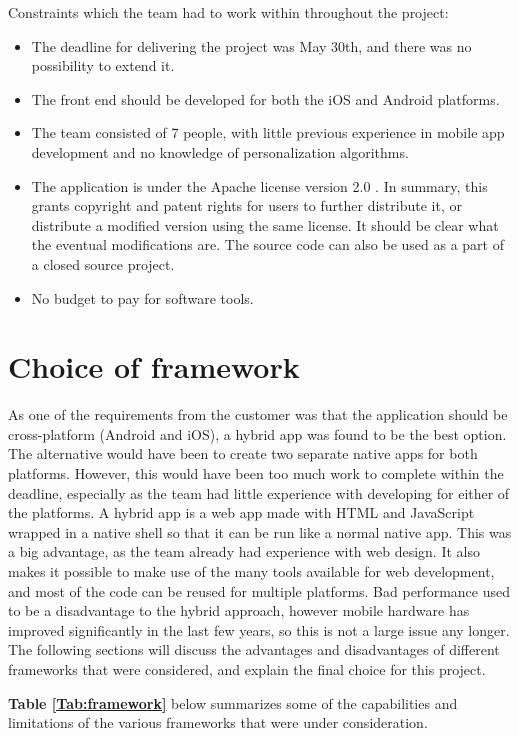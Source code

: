 Constraints which the team had to work within throughout the project:
\begin{itemize}
\item The deadline for delivering the project was May 30th, and there was no possibility to extend it.
\item The front end should be developed for both the iOS and Android platforms.
\item The team consisted of 7 people, with little previous experience in mobile app development and no knowledge of personalization algorithms.
\item The application is under the Apache license version 2.0 \cite{HM7}. In summary, this grants copyright and patent rights for users to further distribute it, or distribute a modified version using the same license. It should be clear what the eventual modifications are. The source code can also be used as a part of a closed source project.
\item No budget to pay for software tools.
\end{itemize}

\section{Choice of framework}

As one of the requirements from the customer was that the application should be cross-platform (Android and iOS), a hybrid app was found to be the best option. The alternative would have been to create two separate native apps for both platforms. However, this would have been too much work to complete within the deadline, especially as the team had little experience with developing for either of the platforms. A hybrid app is a web app made with HTML and JavaScript wrapped in a native shell so that it can be run like a normal native app. This was a big advantage, as the team already had experience with web design. It also makes it possible to make use of the many tools available for web development, and most of the code can be reused for multiple platforms. Bad performance used to be a disadvantage to the hybrid approach, however mobile hardware has improved significantly in the last few years, so this is not a large issue any longer. The following sections will discuss the advantages and disadvantages of different frameworks that were considered, and explain the final choice for this project. \newline

\textbf{Table \ref{Tab:framework}} below summarizes some of the capabilities and limitations of the various frameworks that were under consideration.


